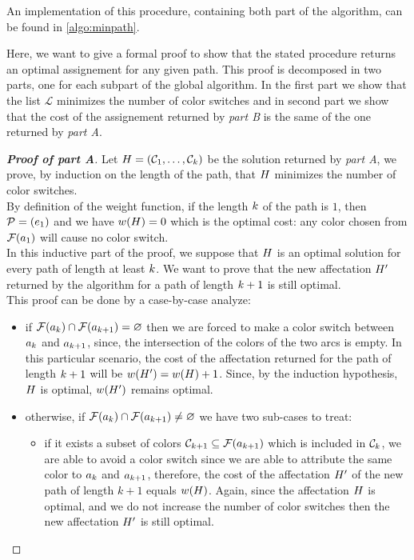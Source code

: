 An implementation of this procedure, containing both part of the algorithm, can be found in \cref{algo:minpath}.

Here, we want to give a formal proof to show that the stated procedure returns an optimal assignement for any given path. This proof is decomposed in two parts, one for each subpart of the global algorithm. In the first part we show that the list $\mathcal{L}$ minimizes the number of color switches and in second part we show that the cost of the assignement returned by \textit{part B} is the same of the one returned by \textit{part A}.

\begin{proof}[\normalfont\textbf{Proof of \textit{part A}}]
	\def\solPartOne{\affect}
	Let $\solPartOne = \row{\C}{\len}$ be the solution returned by \textit{part A}, we prove, by induction on the length of the path, that $\solPartOne$ minimizes the number of color switches. \\
	By definition of the weight function, if the length $k$ of the path is $1$, then $\mathcal{P} = (e_1)$ and we have $\weight(\solPartOne) = 0$ which is the optimal cost: any color chosen from $\mathcal{F}(a_1)$ will cause no color switch.\\
	In this inductive part of the proof, we suppose that $\solPartOne$ is an optimal solution for every path of length at least $k$. We want to prove that the new affectation $\solPartOne'$ returned by the algorithm for a path of length $k+1$ is still optimal. \\
	This proof can be done by a case-by-case analyze:

	\begin{itemize}
		\item if $\mathcal{F}(a_k) \cap \mathcal{F}(a_{k+1}) = \varnothing$ then we are forced to make a color switch between $a_k$ and $a_{k+1}$, since, the intersection of the colors of the two arcs is empty. In this particular scenario, the cost of the affectation returned for the path of length $k + 1$ will be $\weight(\solPartOne') = \weight(\solPartOne) + 1$. Since, by the induction hypothesis, $\solPartOne$ is optimal, $w(H')$ remains optimal.
		\item otherwise, if $\mathcal{F}(a_k) \cap \mathcal{F}(a_{k+1}) \neq \varnothing$ we have two sub-cases to treat:
		      \begin{itemize}

			      \item if it exists a subset of colors $\mathcal{C}_{k+1} \subseteq \mathcal{F}(a_{k+1})$ which is included in $\mathcal{C}_k$, we are able to avoid a color switch since we are able to attribute the same color to $a_k$ and $a_{k+1}$, therefore, the cost of the affectation $\solPartOne'$ of the new path of length $k+1$ equals $\weight(\solPartOne)$. Again, since the affectation $\solPartOne$ is optimal, and we do not increase the number of color switches then the new affectation $\solPartOne'$ is still optimal.


\end{itemize}
\end{itemize}
\end{proof}
